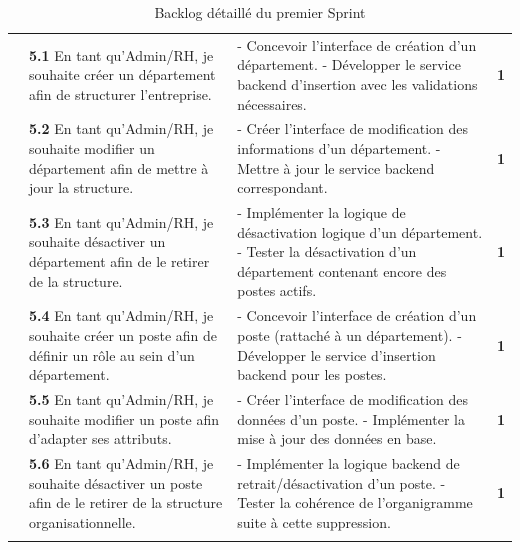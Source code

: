 \begin{small}
\begin{longtable}{|p{2.5cm}|p{6.0cm}|p{6.0cm}|c|}
& \textbf{5.1} En tant qu'Admin/RH, je souhaite créer un département afin de 
structurer l'entreprise.
& - Concevoir l'interface de création d'un département.\newline
- Développer le service backend d'insertion avec les validations nécessaires.
& \textbf{1} \\ 

& \textbf{5.2} En tant qu'Admin/RH, je souhaite modifier un département afin de 
mettre à jour la structure.
& - Créer l'interface de modification des informations d'un département.\newline
- Mettre à jour le service backend correspondant.
& \textbf{1} \\ 

& \textbf{5.3} En tant qu'Admin/RH, je souhaite désactiver un département afin de 
le retirer de la structure.
& - Implémenter la logique de désactivation logique d'un département.\newline
- Tester la désactivation d'un département contenant encore des postes actifs.
& \textbf{1} \\ 

& \textbf{5.4} En tant qu'Admin/RH, je souhaite créer un poste afin de définir 
un rôle au sein d'un département.
& - Concevoir l'interface de création d'un poste (rattaché à un département).\newline
- Développer le service d'insertion backend pour les postes.
& \textbf{1} \\ 

& \textbf{5.5} En tant qu'Admin/RH, je souhaite modifier un poste afin d'adapter 
ses attributs.
& - Créer l'interface de modification des données d'un poste.\newline
- Implémenter la mise à jour des données en base.
& \textbf{1} \\ 

& \textbf{5.6} En tant qu'Admin/RH, je souhaite désactiver un poste afin de le 
retirer de la structure organisationnelle.
& - Implémenter la logique backend de retrait/désactivation d'un poste.\newline
- Tester la cohérence de l'organigramme suite à cette suppression.
& \textbf{1} \\ \hline

\caption{Backlog détaillé du premier Sprint}
\label{tab:backlog-sprint1}
\end{longtable}
\end{small}
\renewcommand{\arraystretch}{1.0}
\normalsize
